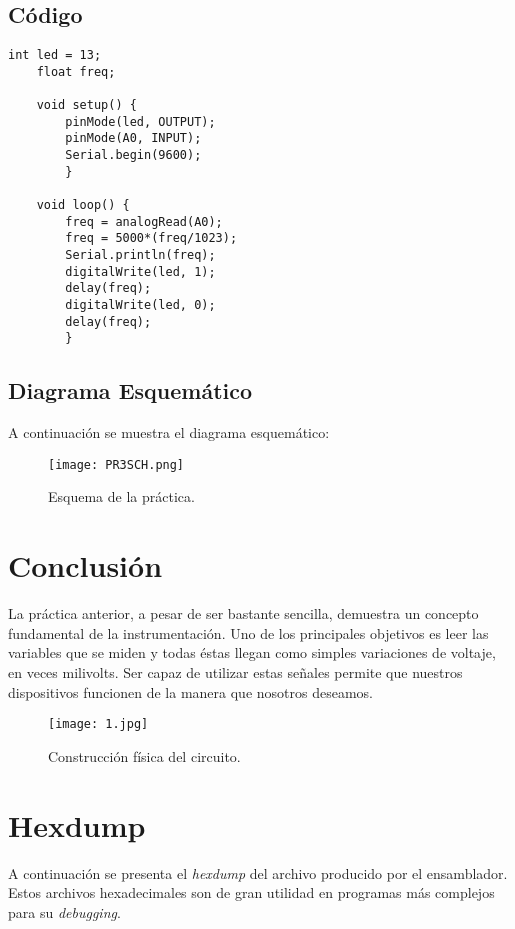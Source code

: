 \documentclass[12pt, letterpaper]{article}
\begin{document}
\subsection*{Código}

\begin{lstlisting}[language=Arduino]
	int led = 13;
	float freq;

	void setup() {
		pinMode(led, OUTPUT);
		pinMode(A0, INPUT);
		Serial.begin(9600);
		}

	void loop() {
		freq = analogRead(A0);
		freq = 5000*(freq/1023);
		Serial.println(freq);
		digitalWrite(led, 1);
		delay(freq);
		digitalWrite(led, 0);
		delay(freq);
		}
\end{lstlisting}

\subsection*{Diagrama Esquemático}

A continuación se muestra el diagrama esquemático:
\begin{figure}[H]
	\centering
	\texttt{[image: PR3SCH.png]}
	\caption{Esquema de la práctica.}
\end{figure}

\section*{Conclusión}

La práctica anterior, a pesar de ser bastante sencilla, demuestra un concepto fundamental de la instrumentación. Uno de los principales objetivos es leer las variables que se miden y todas éstas llegan como simples variaciones de voltaje, en veces milivolts. Ser capaz de utilizar estas señales permite que nuestros dispositivos funcionen de la manera que nosotros deseamos.
\begin{figure}[H]
	\centering
	\texttt{[image: 1.jpg]}
	\caption{Construcción física del circuito.}
\end{figure}

\section*{Hexdump}
A continuación se presenta el \textit{hexdump} del archivo producido por el ensamblador. Estos archivos hexadecimales son de gran utilidad en programas más complejos para su \textit{debugging}.

\scriptsize


\renewcommand\refname{References}
\printbibliography
\end{document}
